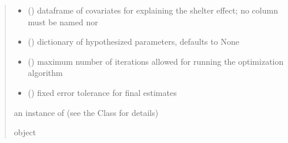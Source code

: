 \documentclass[letterpaper,10pt,english]{sphinxmanual}
\begin{document}
\begin{fulllineitems}
\begin{quote}
\begin{description}
\begin{itemize}
\item {} 
\sphinxAtStartPar
{} () \textendash{} dataframe of covariates for explaining the shelter effect;
no column must be named  nor 

\item {} 
\sphinxAtStartPar
{} (\sphinxstyleliteralemphasis{\sphinxupquote{, }}) \textendash{} dictionary of hypothesized parameters, defaults to None

\item {} 
\sphinxAtStartPar
{} () \textendash{} maximum number of iterations allowed for running the optimization algorithm

\item {} 
\sphinxAtStartPar
{} () \textendash{} fixed error tolerance for final estimates

\end{itemize}

\sphinxAtStartPar
an instance of  (see the Class for details)

\sphinxAtStartPar
object

\end{description}\end{quote}

\end{fulllineitems}

\end{document}
